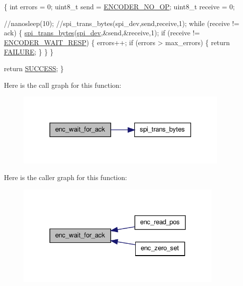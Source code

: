 \begin{DoxyCode}
\{
    \textcolor{keywordtype}{int} errors = 0;
    uint8\_t send = \hyperlink{encoder__functions_8h_ac10b0f18ed2164776ad6843aa7908592}{ENCODER\_NO\_OP};
    uint8\_t receive = 0;
        
  \textcolor{comment}{//nanosleep(10);}
        \textcolor{comment}{//spi\_trans\_bytes(spi\_dev,send,receive,1);}
    \textcolor{keywordflow}{while} (receive != ack) \{
        \hyperlink{group__spi_ga3ae450d2b3ece27bb6036f811a7625a9}{spi\_trans\_bytes}(\hyperlink{CommunicationV0_2communication_8c_a4788f0a5355494bc6c13690e28f43783}{spi\_dev},&send,&receive,1);
        \textcolor{keywordflow}{if} (receive != \hyperlink{encoder__functions_8h_a77c3a97f7312d858d04ec3b4e1fb2176}{ENCODER\_WAIT\_RESP}) \{
            errors++;
            \textcolor{keywordflow}{if} (errors > max\_errors) \{ \textcolor{keywordflow}{return} \hyperlink{calibration_2calibration_8h_a6d58f9ac447476b4e084d7ca383f5183}{FAILURE}; \}
        \}
    \}

    \textcolor{keywordflow}{return} \hyperlink{calibration_2calibration_8h_aa90cac659d18e8ef6294c7ae337f6b58}{SUCCESS};
\}
\end{DoxyCode}


Here is the call graph for this function\-:
\nopagebreak
\begin{figure}[H]
\begin{center}
\leavevmode
\includegraphics[width=296pt]{group__enc_gad82fb44f2e735628ec95e003e4a1f93c_cgraph}
\end{center}
\end{figure}




Here is the caller graph for this function\-:
\nopagebreak
\begin{figure}[H]
\begin{center}
\leavevmode
\includegraphics[width=288pt]{group__enc_gad82fb44f2e735628ec95e003e4a1f93c_icgraph}
\end{center}
\end{figure}


